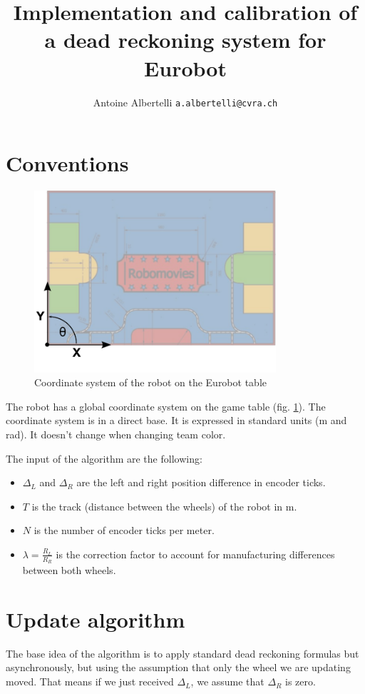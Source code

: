 \documentclass[a4paper]{paper}
\author{Antoine Albertelli \texttt{a.albertelli@cvra.ch}}
\title{Implementation and calibration of a dead reckoning system for Eurobot}
\begin{document}
\maketitle
\tableofcontents

\section{Conventions}
\begin{figure}[h]
    \begin{center}
        \includegraphics[width=0.8\textwidth]{table}
        \caption{Coordinate system of the robot on the Eurobot table}
        \label{fig:coordinates}
    \end{center}
\end{figure}

The robot has a global coordinate system on the game table (fig. \ref{fig:coordinates}).
The coordinate system is in a direct base.
It is expressed in standard units (\si{\meter} and \si{\radian}).
It doesn't change when changing team color.

The input of the algorithm are the following:
\begin{itemize}
    \item $\Delta_L$ and $\Delta_R$ are the left and right position difference in encoder ticks.
    \item $T$ is the track (distance between the wheels) of the robot in \si{\meter}.
    \item $N$ is the number of encoder ticks per meter.
    \item $\lambda = \frac{R_L}{R_R}$ is the correction factor to account for manufacturing differences between both wheels.
\end{itemize}

\section{Update algorithm}
The base idea of the algorithm is to apply standard dead reckoning formulas but asynchronously, but using the assumption that only the wheel we are updating moved.
That means if we just received $\Delta_L$, we assume that $\Delta_R$ is zero.
\end{document}
